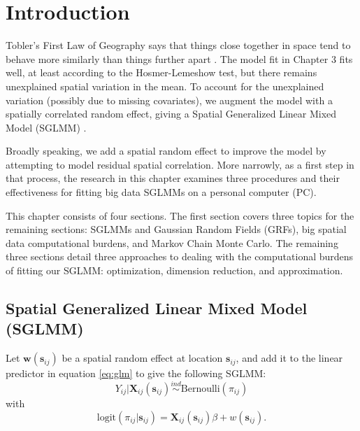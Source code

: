 \section{Introduction} %

Tobler's First Law of Geography says that things close together in space tend to behave more similarly than things further apart \citep{Tobler1970}. The model fit in Chapter 3 fits well, at least according to the Hosmer-Lemeshow test, but there remains unexplained spatial variation in the mean. To account for the unexplained variation (possibly due to missing covariates), we augment the model with a spatially correlated random effect, giving a Spatial Generalized Linear Mixed Model (SGLMM) \citep{Banerjee2008}.

Broadly speaking, we add a spatial random effect to improve the model by attempting to model residual spatial correlation. More narrowly, as a first step in that process, the research in this chapter examines three procedures and their effectiveness for fitting big data SGLMMs on a personal computer (PC).

This chapter consists of four sections. The first section covers three topics for the remaining sections:  SGLMMs and Gaussian Random Fields (GRFs), big spatial data computational burdens, and Markov Chain Monte Carlo. The remaining three sections detail three approaches to dealing with the computational burdens of fitting our SGLMM: optimization, dimension reduction, and approximation.

\subsection{Spatial Generalized Linear Mixed Model (SGLMM)} %
Let $\pmb{w}(\pmb{s}_{ij})$ be a spatial random effect at location $\pmb{s}_{ij}$, and add it to the linear predictor in equation \ref{eq:glm} to give the following SGLMM:
\begin{equation}
Y_{ij}|\mathbf{X}_{ij}(\mathbf{s}_{ij}) \stackrel{ind}{\sim} \mbox{Bernoulli}(\pi_{ij}) 
\end{equation}
with
\begin{equation} \text{logit}(\pi_{ij}|\pmb{s}_{ij}) = \mathbf{X}_{ij}(\mathbf{s}_{ij})\beta + w(\pmb{s}_{ij}). 
\end{equation}

